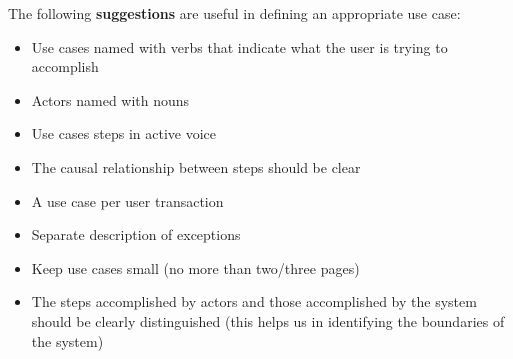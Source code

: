 \noindent
The following \textbf{suggestions} are useful in defining an appropriate use case:
\begin{itemize}
    \item Use cases named with verbs that indicate what the user is trying to accomplish
    \item Actors named with nouns
    \item Use cases steps in active voice
    \item The causal relationship between steps should be clear
    \item A use case per user transaction
    \item Separate description of exceptions
    \item Keep use cases small (no more than two/three pages)
    \item The steps accomplished by actors and those accomplished by the system should be clearly distinguished (this helps us in identifying the boundaries of the system)
\end{itemize}

\newpage

